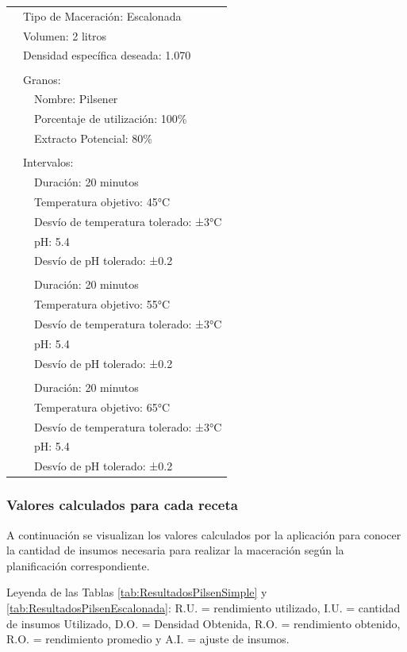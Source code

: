 \begin{longtable}{p{0.6cm} p{0.6cm} p{12.8cm}}
        & \multicolumn{2}{l}{Tipo de Maceración: Escalonada} \\
        & \multicolumn{2}{l}{Volumen: 2 litros}  \\
        & \multicolumn{2}{l}{Densidad específica deseada: 1.070} \\
        & & \\
        & \multicolumn{2}{l}{Granos:} \\
        & & Nombre: Pilsener \\
        & & Porcentaje de utilización: 100\% \\
        & & Extracto Potencial: 80\% \\
        & & \\
        & \multicolumn{2}{l}{Intervalos:} \\
        & & Duración: 20 minutos \\
        & & Temperatura objetivo: 45°C \\
        & & Desvío de temperatura tolerado: ±3°C \\
        & & pH: 5.4 \\
        & & Desvío de pH tolerado: ±0.2 \\
        & & \\
        & & Duración: 20 minutos \\
        & & Temperatura objetivo: 55°C \\
        & & Desvío de temperatura tolerado: ±3°C \\
        & & pH: 5.4 \\
        & & Desvío de pH tolerado: ±0.2 \\
        & & \\
        & & Duración: 20 minutos \\
        & & Temperatura objetivo: 65°C \\
        & & Desvío de temperatura tolerado: ±3°C \\
        & & pH: 5.4 \\
        & & Desvío de pH tolerado: ±0.2 \\

        \end{longtable}
    
    \subsubsection{Valores calculados para cada receta}
    \par A continuación se visualizan los valores calculados por la aplicación para conocer la cantidad de insumos necesaria para realizar la maceración según la planificación correspondiente.
    \par Leyenda de las Tablas \ref{tab:ResultadosPilsenSimple} y \ref{tab:ResultadosPilsenEscalonada}: R.U. = rendimiento utilizado, I.U. = cantidad de insumos Utilizado, D.O. = Densidad Obtenida, R.O. = rendimiento obtenido, R.O. = rendimiento promedio y A.I. = ajuste de insumos.
    

